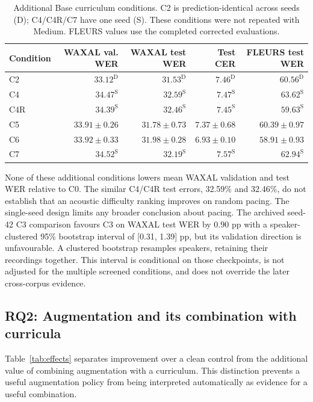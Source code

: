 \documentclass[12pt,a4paper]{report}
\begin{document}
\begin{table}[htbp]\centering\small
\caption{Additional Base curriculum conditions. C2 is prediction-identical
across seeds (D); C4/C4R/C7 have one seed (S). These conditions were not
repeated with Medium. FLEURS values use the completed corrected evaluations.}
\label{tab:base-screen}
\begin{tabular}{lrrrr}\toprule
Condition & WAXAL val. WER & WAXAL test WER & Test CER & FLEURS test WER\\\midrule
C2 & $33.12^{\mathrm{D}}$ & $31.53^{\mathrm{D}}$ & $7.46^{\mathrm{D}}$ & $60.56^{\mathrm{D}}$ \\
C4 & $34.47^{\mathrm{S}}$ & $32.59^{\mathrm{S}}$ & $7.47^{\mathrm{S}}$ & $63.62^{\mathrm{S}}$ \\
C4R & $34.39^{\mathrm{S}}$ & $32.46^{\mathrm{S}}$ & $7.45^{\mathrm{S}}$ & $59.63^{\mathrm{S}}$ \\
C5 & $33.91 \pm 0.26$ & $31.78 \pm 0.73$ & $7.37 \pm 0.68$ & $60.39 \pm 0.97$ \\
C6 & $33.92 \pm 0.33$ & $31.98 \pm 0.28$ & $6.93 \pm 0.10$ & $58.91 \pm 0.93$ \\
C7 & $34.52^{\mathrm{S}}$ & $32.19^{\mathrm{S}}$ & $7.57^{\mathrm{S}}$ & $62.94^{\mathrm{S}}$ \\
\bottomrule\end{tabular}\end{table}

None of these additional conditions lowers mean WAXAL validation and test
WER relative to C0. The similar C4/C4R test errors, 32.59\% and 32.46\%,
do not establish that an acoustic difficulty ranking improves on random
pacing. The single-seed design limits any broader conclusion about pacing.
The archived seed-42 C3 comparison favours C3 on WAXAL test WER by 0.90 pp
with a speaker-clustered 95\% bootstrap interval of [0.31, 1.39] pp, but
its validation direction is unfavourable. A clustered bootstrap resamples
speakers, retaining their recordings together. This interval is conditional
on those checkpoints, is not adjusted for the multiple screened conditions,
and does not override the later cross-corpus evidence.

\subsection{RQ2: Augmentation and its combination with curricula}

Table~\ref{tab:effects} separates improvement over a clean control from the
additional value of combining augmentation with a curriculum. This distinction
prevents a useful augmentation policy from being interpreted automatically
as evidence for a useful combination.
\end{document}
